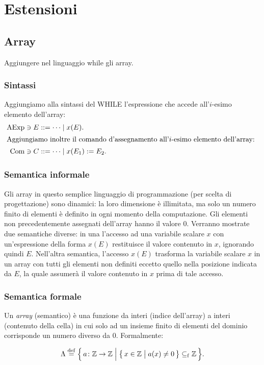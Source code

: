 \chapter{Estensioni}

\section{Array} 

Aggiungere nel linguaggio while gli array.

\subsection{Sintassi}

Aggiungiamo alla sintassi del WHILE l'espressione che accede
all'$i$-esimo elemento dell'array:
\begin{align*}
  \AExp \ni E &::= \dots \vbar x(E). \\
\intertext{%
Aggiungiamo inoltre il comando d'assegnamento all'$i$-esimo elemento
dell'array:
}
  \Com \ni C &::= \dots \vbar x(E_1) := E_2.
\end{align*}

\subsection{Semantica informale}

Gli array in questo semplice linguaggio di programmazione (per scelta
di progettazione) sono dinamici: la loro dimensione è illimitata, ma
solo un numero finito di elementi è definito in ogni momento della
computazione.  Gli elementi non precedentemente assegnati dell'array
hanno il valore $0$.  Verranno mostrate due semantiche diverse: in una
l'accesso ad una variabile scalare $x$ con un'espressione della forma
$x(E)$ restituisce il valore contenuto in $x$, ignorando quindi $E$.
Nell'altra semantica, l'accesso $x(E)$ trasforma la variabile scalare
$x$ in un array con tutti gli elementi non definiti eccetto quello
nella posizione indicata da $E$, la quale assumerà il valore contenuto
in $x$ prima di tale accesso.

\subsection{Semantica formale}

\begin{definizione} 
Un \emph{array} (semantico) è una funzione da interi (indice
dell'array) a interi (contenuto della cella) in cui solo ad un insieme
finito di elementi del dominio corrisponde un numero diverso da $0$.
Formalmente:

\[
  \Lambda
    \defeq
      \Bigl\{\,
        \fund{a}{\Zset}{\Zset}
      \Bigm|
        \bigl\{\, x \in \Zset \bigm| a(x) \neq 0 \,\bigr\} \sseqf \Zset
      \,\Bigr\}.
\]
\end{definizione}

